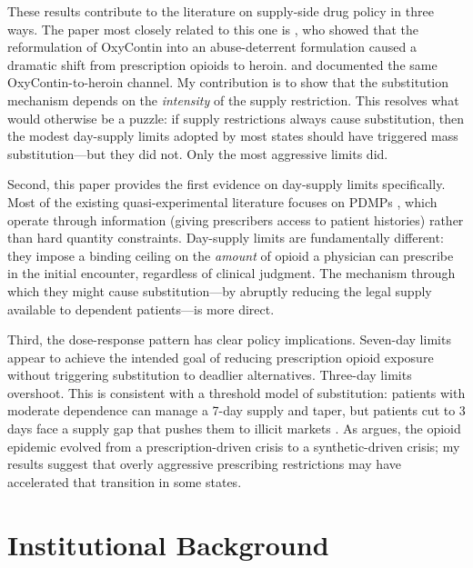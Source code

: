 \documentclass[12pt]{article}
\begin{document}
These results contribute to the literature on supply-side drug policy in three ways. The paper most closely related to this one is \citet{alpert2018supply}, who showed that the reformulation of OxyContin into an abuse-deterrent formulation caused a dramatic shift from prescription opioids to heroin. \citet{evans2019how} and \citet{cicero2012effect} documented the same OxyContin-to-heroin channel. My contribution is to show that the substitution mechanism depends on the \textit{intensity} of the supply restriction. This resolves what would otherwise be a puzzle: if supply restrictions always cause substitution, then the modest day-supply limits adopted by most states should have triggered mass substitution---but they did not. Only the most aggressive limits did.

Second, this paper provides the first evidence on day-supply limits specifically. Most of the existing quasi-experimental literature focuses on PDMPs \citep{buchmueller2020effect, mallatt2020policy, grecu2019mandatory, meinhofer2022prescription}, which operate through information (giving prescribers access to patient histories) rather than hard quantity constraints. Day-supply limits are fundamentally different: they impose a binding ceiling on the \textit{amount} of opioid a physician can prescribe in the initial encounter, regardless of clinical judgment. The mechanism through which they might cause substitution---by abruptly reducing the legal supply available to dependent patients---is more direct.

Third, the dose-response pattern has clear policy implications. Seven-day limits appear to achieve the intended goal of reducing prescription opioid exposure without triggering substitution to deadlier alternatives. Three-day limits overshoot. This is consistent with a threshold model of substitution: patients with moderate dependence can manage a 7-day supply and taper, but patients cut to 3 days face a supply gap that pushes them to illicit markets \citep{cicero2015changing}. As \citet{ruhm2019drivers} argues, the opioid epidemic evolved from a prescription-driven crisis to a synthetic-driven crisis; my results suggest that overly aggressive prescribing restrictions may have accelerated that transition in some states.


\section{Institutional Background}
\end{document}
